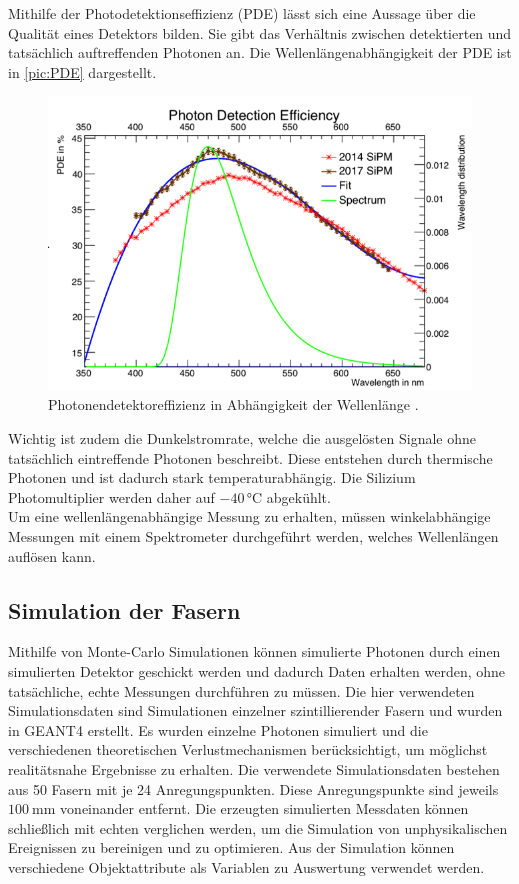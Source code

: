 Mithilfe der Photodetektionseffizienz (PDE) lässt sich eine Aussage über die Qualität eines Detektors bilden. Sie gibt das Verhältnis zwischen 
detektierten und tatsächlich auftreffenden Photonen an. Die Wellenlängenabhängigkeit der PDE ist in \autoref{pic:PDE} dargestellt.\\

\begin{figure}
    \centering
    \includegraphics[width = .8\textwidth]{content/pics/PDE.png}
    \caption{Photonendetektoreffizienz in Abhängigkeit der Wellenlänge \cite{SciFi_Versuch}.}
    \label{pic:PDE}
\end{figure}

Wichtig ist zudem die Dunkelstromrate, welche die ausgelösten Signale ohne tatsächlich eintreffende Photonen beschreibt. Diese entstehen durch
thermische Photonen und ist dadurch stark temperaturabhängig. Die Silizium Photomultiplier werden daher auf $-40 \, ° \mathrm{C}$ abgekühlt.\\
Um eine wellenlängenabhängige Messung zu erhalten, müssen winkelabhängige Messungen mit einem Spektrometer durchgeführt werden, welches Wellenlängen auflösen kann.

\subsection{Simulation der Fasern}

Mithilfe von Monte-Carlo Simulationen können simulierte Photonen durch einen simulierten Detektor geschickt werden und dadurch Daten erhalten
werden, ohne tatsächliche, echte Messungen durchführen zu müssen. Die hier verwendeten Simulationsdaten sind Simulationen einzelner szintillierender
Fasern und wurden in GEANT4 erstellt. Es wurden einzelne Photonen simuliert und die verschiedenen theoretischen Verlustmechanismen berücksichtigt,
um möglichst realitätsnahe Ergebnisse zu erhalten. Die verwendete Simulationsdaten bestehen aus 50 Fasern mit je 24 Anregungspunkten. Diese
Anregungspunkte sind jeweils $\qty{100}{\milli\metre}$ voneinander entfernt. Die erzeugten simulierten Messdaten können schließlich mit echten 
verglichen werden, um die Simulation von unphysikalischen Ereignissen zu bereinigen und zu optimieren. Aus der Simulation können verschiedene Objektattribute
als Variablen zu Auswertung verwendet werden.